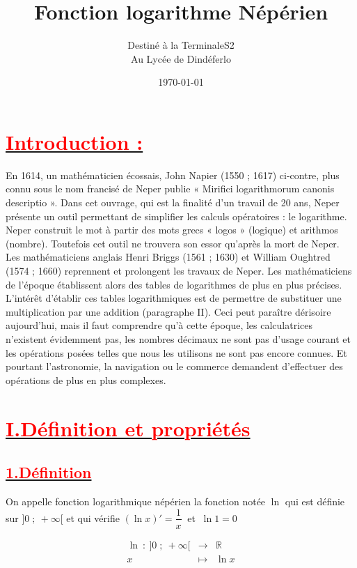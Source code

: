 \documentclass[12pt]{article}
\author{Destiné à la TerminaleS2\\Au Lycée de Dindéferlo}
\title{\textbf{Fonction logarithme Népérien}}
\date{\today}
\begin{document}
\maketitle
\newpage

\section*{\underline{\textbf{\textcolor{red}{Introduction :}}}}

En 1614, un mathématicien écossais, John Napier (1550 ; 1617) ci-contre, plus connu sous le nom francisé de Neper publie « Mirifici logarithmorum canonis descriptio ».
Dans cet ouvrage, qui est la finalité d’un travail de 20 ans, Neper présente un outil permettant de simplifier les calculs opératoires : le logarithme.
Neper construit le mot à partir des mots grecs « logos » (logique) et arithmos (nombre).
Toutefois cet outil ne trouvera son essor qu’après la mort de Neper. Les mathématiciens anglais Henri Briggs (1561 ; 1630) et William Oughtred (1574 ; 1660) reprennent et prolongent les travaux de Neper.
Les mathématiciens de l’époque établissent alors des tables de logarithmes de plus en plus précises.
L’intérêt d’établir ces tables logarithmiques est de permettre de substituer une multiplication par une addition (paragraphe II). Ceci peut paraître dérisoire aujourd’hui, mais il faut comprendre qu’à cette époque, les calculatrices n’existent évidemment pas, les nombres décimaux ne sont pas d’usage courant et les opérations posées telles que nous les utilisons ne sont pas encore connues. Et pourtant l'astronomie, la navigation ou le commerce demandent d’effectuer des opérations de plus en plus complexes.

\section*{\underline{\textbf{\textcolor{red}{I.Définition et propriétés}}}}
\subsection*{\underline{\textbf{\textcolor{red}{1.Définition}}}}
On appelle fonction logarithmique népérien la fonction notée $\ln$ qui est définie sur $]0\;;\ +\infty[$ et qui vérifie $(\ln x)'=\dfrac{1}{x}\ $ et $\ \ln 1=0$

$$\begin{array}{rcl}
\ln\ :\ ]0\;;\ +\infty[ & \longrightarrow & \mathbb{R} \\
x & \longmapsto & \ln x
\end{array}$$
\end{document}

